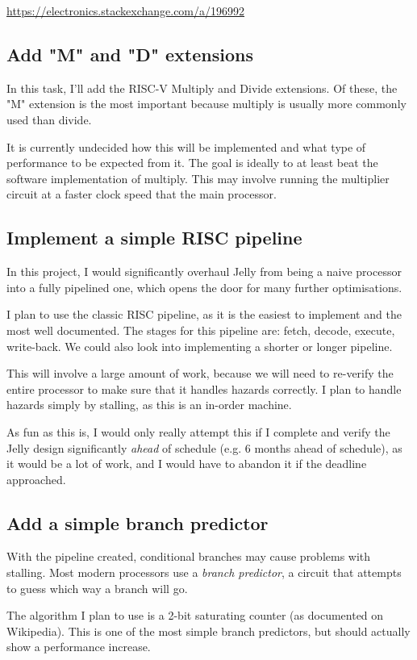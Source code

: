 \documentclass{article}
\begin{document}
\url{https://electronics.stackexchange.com/a/196992}

\subsection{Add "M" and "D" extensions}
In this task, I'll add the RISC-V Multiply and Divide extensions. Of these, the "M" extension is the most
important because multiply is usually more commonly used than divide.

It is currently undecided how this will be implemented and what type of performance to be expected from it.
The goal is ideally to at least beat the software implementation of multiply. This may involve running the
multiplier circuit at a faster clock speed that the main processor.

\subsection{Implement a simple RISC pipeline}
In this project, I would significantly overhaul Jelly from being a naive processor into a fully pipelined
one, which opens the door for many further optimisations.

I plan to use the classic RISC pipeline, as it is the easiest to implement and the most well documented. The
stages for this pipeline are: fetch, decode, execute, write-back. We could also look into implementing a
shorter or longer pipeline.

This will involve a large amount of work, because we will need to re-verify the entire processor to make sure
that it handles hazards correctly. I plan to handle hazards simply by stalling, as this is an in-order
machine.

As fun as this is, I would only really attempt this if I complete and verify the Jelly design significantly
\textit{ahead} of schedule (e.g. 6 months ahead of schedule), as it would be a lot of work, and I would have
to abandon it if the deadline approached.

\subsection{Add a simple branch predictor}
With the pipeline created, conditional branches may cause problems with stalling. Most modern processors use
a \textit{branch predictor}, a circuit that attempts to guess which way a branch will go.

The algorithm I plan to use is a 2-bit saturating counter (as documented on Wikipedia). This is one of the
most simple branch predictors, but should actually show a performance increase.
\end{document}
